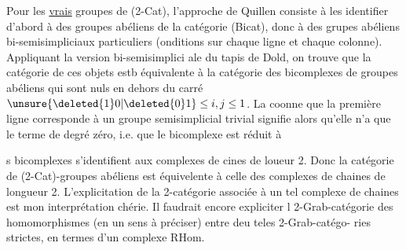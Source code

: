 Pour les \uline{vrais} groupes de (2-Cat), l'approche de Quillen consiste à
les identifier d'abord à des groupes abéliens de la catégorie (Bicat),
donc à des grupes abéliens bi-semisimpliciaux particuliers (onditions
sur chaque ligne et chaque colonne). Appliquant la version bi-semisimplici
ale du tapis de Dold, on trouve que  la catégorie de ces objets
estb équivalente à la catégorie des  bicomplexes de groupes abéliens
qui sont nuls en dehors du carré $\unsure{\deleted{1}0|\deleted{0}1}\leq i,j\leq1$.  La coonne
que la première ligne corresponde à un  groupe semisimplicial
trivial signifie alors qu'elle n'a que le terme de degré zéro, i.e. que
le bicomplexe est réduit à



s bicomplexes s'identifient aux complexes de cines de loueur 2.\linebreak
Donc la catégorie de (2-Cat)-groupes abéliens est équivelente à celle des\linebreak
complexes de chaines de longueur 2. L'explicitation de la 2-catégorie\linebreak
associée à un tel complexe de chaines est mon interprétation chérie. Il\linebreak
faudrait encore expliciter l 2-Grab-catégorie des\linebreak
homomorphismes (en un sens à préciser) entre deu teles 2-Grab-catégo-\linebreak
ries strictes, en termes d'un complexe $\mathrm{RHom}$.

